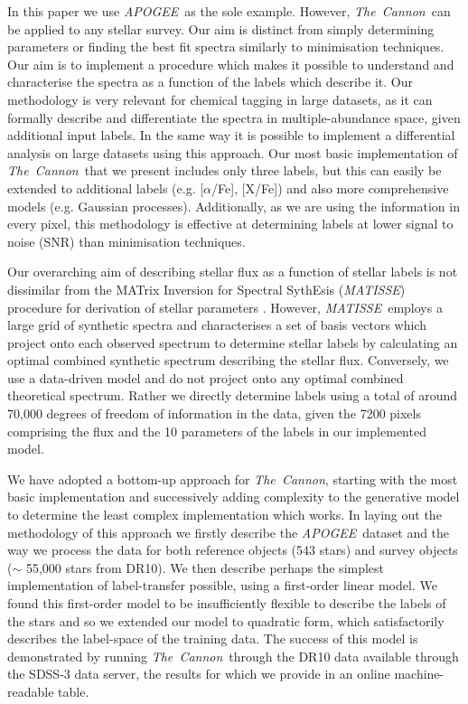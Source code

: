 \documentclass[12pt, preprint]{aastex}
\newcommand{\tc}{\textsl{The~Cannon}}
\newcommand{\apogee}{\textsl{APOGEE}}
\newcommand{\matisse}{\textsl{MATISSE}}
\begin{document}
In this paper we use \apogee\ as the sole example. 
However, \tc\ can be applied to any stellar survey.  
Our aim is distinct from simply determining parameters or finding the best fit spectra similarly to minimisation techniques. 
Our aim is to implement a procedure which makes it possible to understand and characterise the spectra as a function of the labels which describe it.  
Our methodology is very relevant for chemical tagging in large datasets, as it can formally describe and differentiate the spectra in multiple-abundance space, given additional input labels.
In the same way it is possible to implement a differential analysis on large datasets using this approach. 
Our most basic implementation of \tc\ that we present includes only three labels, but this can easily be extended to additional labels  (e.g. [$\alpha$/Fe], [X/Fe]) and also more comprehensive models (e.g. Gaussian processes). 
Additionally, as we are using the information in every pixel, this methodology is effective at determining labels at lower signal to noise (SNR) than minimisation techniques.%

Our overarching aim of describing stellar flux as a function of stellar labels is not dissimilar from the MATrix Inversion for Spectral SythEsis (\matisse) procedure for derivation of stellar parameters \citep{RB2006}. 
However, \matisse\ employs a large grid of synthetic spectra and characterises a set of basis vectors which project onto each observed spectrum to determine stellar labels by calculating an optimal combined synthetic spectrum describing the stellar flux. 
Conversely, we use a data-driven model and do not project onto any optimal combined theoretical spectrum. 
Rather we directly determine labels using a total of around 70,000 degrees of freedom of information in the data, given the 7200 pixels comprising the flux and the 10 parameters of the labels in our implemented model. 

We have adopted a bottom-up approach for \tc, starting with the most basic implementation and successively adding complexity to the generative model to determine the least complex implementation which works.  
In laying out the methodology of this approach we firstly describe the \apogee\ dataset and the way we process the data for both reference objects (543 stars) and survey objects ($\sim$ 55,000 stars from DR10). 
We then describe perhaps the simplest implementation of label-transfer possible, using a first-order linear model. We found this first-order model to be insufficiently flexible to describe the labels of the stars and so we extended our model to quadratic form, which satisfactorily describes the label-space of the training data.
The success of this model is demonstrated by running \tc\ through the DR10 data available through the SDSS-3 data server, the results for which we provide in an online machine-readable table. %
\end{document}
